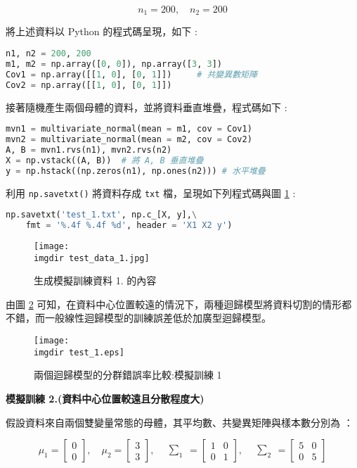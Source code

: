 \[n_1 = 200, \quad n_2 = 200\]

將上述資料以 Python 的程式碼呈現，如下 :
\bigskip
\begin{lstlisting}[language = Python]
n1, n2 = 200, 200
m1, m2 = np.array([0, 0]), np.array([3, 3])
Cov1 = np.array([[1, 0], [0, 1]])     # 共變異數矩陣
Cov2 = np.array([[1, 0], [0, 1]])
\end{lstlisting}

接著隨機產生兩個母體的資料，並將資料垂直堆疊，程式碼如下 : 
\bigskip
\begin{lstlisting}[language = Python]
mvn1 = multivariate_normal(mean = m1, cov = Cov1)
mvn2 = multivariate_normal(mean = m2, cov = Cov2)
A, B = mvn1.rvs(n1), mvn2.rvs(n2)
X = np.vstack((A, B))  # 將 A, B 垂直堆疊
y = np.hstack((np.zeros(n1), np.ones(n2))) # 水平堆疊
\end{lstlisting}

利用 \verb|np.savetxt()| 將資料存成 \verb|txt| 檔，呈現如下列程式碼與圖 \ref{fig:test_data_1} : 
\bigskip
\begin{lstlisting}[language = Python]
np.savetxt('test_1.txt', np.c_[X, y],\
	fmt = '%.4f %.4f %d', header = 'X1 X2 y')
\end{lstlisting}

\begin{figure}[H]
    \centering
        \texttt{[image: \\imgdir test\_data\_1.jpg]}
    \caption{生成模擬訓練資料 1. 的內容}
    \label{fig:test_data_1}
\end{figure}

由圖 \ref{fig:test_1} 可知，在資料中心位置較遠的情況下，兩種迴歸模型將資料切割的情形都不錯，而一般線性迴歸模型的訓練誤差低於加廣型迴歸模型。
\begin{figure}[H]
    \centering
        \texttt{[image: \\imgdir test\_1.eps]}
    \caption{兩個迴歸模型的分群錯誤率比較:模擬訓練 1}
    \label{fig:test_1}
\end{figure}

\textbf{\large 模擬訓練 2.(資料中心位置較遠且分散程度大)}

假設資料來自兩個雙變量常態的母體，其平均數、共變異矩陣與樣本數分別為 ：

\[\mu_1 = \begin{bmatrix}
0 \\
0
\end{bmatrix}, \quad \mu_2 = \begin{bmatrix}
3 \\
3
\end{bmatrix}, \quad \begin{matrix} \sum_{1} \end{matrix} = \begin{bmatrix}
1 & 0\\
0 & 1
\end{bmatrix}, \quad \begin{matrix} \sum_{2} \end{matrix} = \begin{bmatrix}
5 & 0\\
0 & 5
\end{bmatrix}\]

